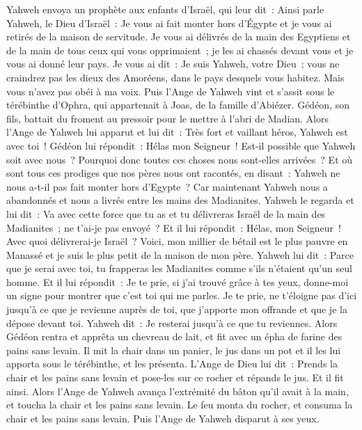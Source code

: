 \begin{multicols}{2}
Yahweh envoya un prophète aux enfants d'Israël, qui leur dit~: Ainsi parle Yahweh, le Dieu d'Israël~: Je vous ai fait monter hors d'Égypte et je vous ai retirés de la maison de servitude.
Je vous ai délivrés de la main des Egyptiens et de la main de tous ceux qui vous opprimaient~; je les ai chassés devant vous et je vous ai donné leur pays.
Je vous ai dit~: Je suis Yahweh, votre Dieu~; vous ne craindrez pas les dieux des Amoréens, dans le pays desquels vous habitez. Mais vous n'avez pas obéi à ma voix.
Puis l'Ange de Yahweh vint et s'assit sous le térébinthe d'Ophra, qui appartenait à Joas, de la famille d'Abiézer. Gédéon, son fils, battait du froment au pressoir pour le mettre à l'abri de Madian.
Alors l'Ange de Yahweh lui apparut et lui dit~: Très fort et vaillant héros, Yahweh est avec toi~!
Gédéon lui répondit~: Hélas mon Seigneur~! Est-il possible que Yahweh soit avec nous~? Pourquoi donc toutes ces choses nous sont-elles arrivées~? Et où sont tous ces prodiges que nos pères nous ont racontés, en disant~: Yahweh ne nous a-t-il pas fait monter hors d'Egypte~? Car maintenant Yahweh nous a abandonnés et nous a livrés entre les mains des Madianites.
Yahweh le regarda et lui dit~: Va avec cette force que tu as et tu délivreras Israël de la main des Madianites~; ne t'ai-je pas envoyé~?
Et il lui répondit~: Hélas, mon Seigneur~! Avec quoi délivrerai-je Israël~? Voici, mon millier de bétail est le plus pauvre en Manassé et je suis le plus petit de la maison de mon père.
Yahweh lui dit~: Parce que je serai avec toi, tu frapperas les Madianites comme s'ils n'étaient qu'un seul homme.
Et il lui répondit~: Je te prie, si j'ai trouvé grâce à tes yeux, donne-moi un signe pour montrer que c'est toi qui me parles.
Je te prie, ne t'éloigne pas d'ici jusqu'à ce que je revienne auprès de toi, que j'apporte mon offrande et que je la dépose devant toi. Yahweh dit~: Je resterai jusqu'à ce que tu reviennes.
Alors Gédéon rentra et apprêta un chevreau de lait, et fit avec un épha de farine des pains sans levain. Il mit la chair dans un panier, le jus dans un pot et il les lui apporta sous le térébinthe, et les présenta.
L'Ange de Dieu lui dit~: Prends la chair et les pains sans levain et pose-les sur ce rocher et répands le jus. Et il fit ainsi.
Alors l'Ange de Yahweh avança l'extrémité du bâton qu'il avait à la main, et toucha la chair et les pains sans levain. Le feu monta du rocher, et consuma la chair et les pains sans levain. Puis l'Ange de Yahweh disparut à ses yeux.

\end{multicols}
